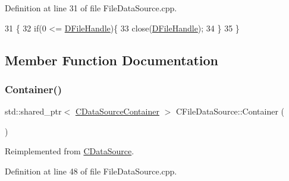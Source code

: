 Definition at line 31 of file File\+Data\+Source.\+cpp.


\begin{DoxyCode}
31                                  \{
32     \textcolor{keywordflow}{if}(0 <= \hyperlink{classCFileDataSource_abad036de6dfe018ddc6160a2026a401d}{DFileHandle})\{
33         close(\hyperlink{classCFileDataSource_abad036de6dfe018ddc6160a2026a401d}{DFileHandle});   
34     \}
35 \}
\end{DoxyCode}


\subsection{Member Function Documentation}
\hypertarget{classCFileDataSource_a2492b88ea8186c4cbd4bdfa92060f5fa}{}\label{classCFileDataSource_a2492b88ea8186c4cbd4bdfa92060f5fa} 
\subsubsection{\texorpdfstring{Container()}{Container()}}
{\footnotesize\ttfamily std\+::shared\+\_\+ptr$<$ \hyperlink{classCDataSourceContainer}{C\+Data\+Source\+Container} $>$ C\+File\+Data\+Source\+::\+Container (\begin{DoxyParamCaption}{ }\end{DoxyParamCaption})\hspace{0.3cm}{\ttfamily [virtual]}}



Reimplemented from \hyperlink{classCDataSource_ada14cfe01c850d01b23c9b49d2f65efc}{C\+Data\+Source}.



Definition at line 48 of file File\+Data\+Source.\+cpp.


